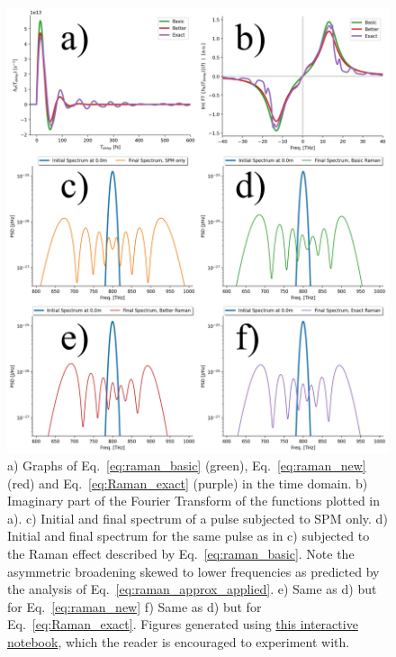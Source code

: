 \begin{figure}
    \centering
    \includegraphics[width=1\linewidth]{figures/Raman_combined.png}
    \caption{a) Graphs of Eq.~\ref{eq:raman_basic} (green), Eq.~\ref{eq:raman_new} (red) and Eq.~\ref{eq:Raman_exact} (purple) in the time domain. b) Imaginary part of the Fourier Transform of the functions plotted in a). c) Initial and final spectrum of a pulse subjected to SPM only. d) Initial and final spectrum for the same pulse as in c) subjected to the Raman effect described by Eq.~\ref{eq:raman_basic}. Note the asymmetric broadening skewed to lower frequencies as predicted by the analysis of Eq.~\ref{eq:raman_approx_applied}. e) Same as d) but for Eq.~\ref{eq:raman_new} f) Same as d) but for Eq.~\ref{eq:Raman_exact}. Figures generated using \href{https://colab.research.google.com/drive/1TqixCGQ51DVwpB3VA6J1XQCpDcf4xwb4?usp=sharing}{this interactive notebook}, which the reader is encouraged to experiment with.}
    \label{fig:raman_combined}
\end{figure}




